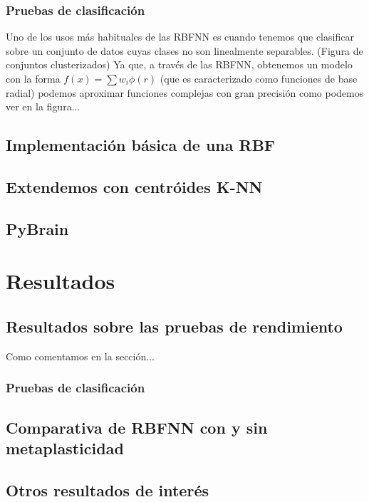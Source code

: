 \documentclass[10pt,a4paper, twocolumn]{report}
\begin{document}
\subsection{Pruebas de clasificación}
Uno de los usos más habituales de las RBFNN es cuando tenemos que clasificar sobre un conjunto de datos cuyas clases no son linealmente separables.
(Figura de conjuntos clusterizados)
Ya que, a través de las RBFNN, obtenemos un modelo con la forma $f(x)=\sum w_{i}\phi(r)$ (que es caracterizado como funciones de base radial) podemos aproximar funciones complejas con gran precisión como podemos ver en la figura...
\section{Implementación básica de una RBF}

\section{Extendemos con centróides K-NN}
\section{PyBrain}


\chapter{Resultados}
\section{Resultados sobre las pruebas de rendimiento}
Como comentamos en la sección... 
\subsection{Pruebas de clasificación}
\section{Comparativa de RBFNN con y sin metaplasticidad}
\section{Otros resultados de interés}
\end{document}

